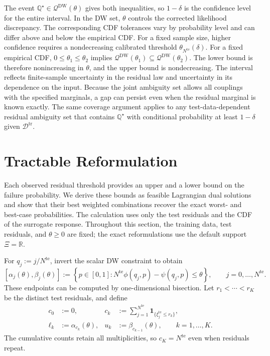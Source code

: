 \documentclass[review,11pt,3p,authoryear,nopreprintline]{elsarticle}
\begin{document}
The event $\mathbb Q^\star\in\mathscr Q^{\mathrm{DW}}(\theta)$ gives both inequalities, so $1-\delta$ is the confidence level for the entire interval. In the DW set, $\theta$ controls the corrected likelihood discrepancy. The corresponding CDF tolerances vary by probability level and can differ above and below the empirical CDF. For a fixed sample size, higher confidence requires a nondecreasing calibrated threshold $\theta_{N^{\mathrm{te}}}(\delta)$. For a fixed empirical CDF, $0\le\theta_1\le\theta_2$ implies $\mathscr Q^{\mathrm{DW}}(\theta_1)\subseteq\mathscr Q^{\mathrm{DW}}(\theta_2)$. The lower bound is therefore nonincreasing in $\theta$, and the upper bound is nondecreasing. The interval reflects finite-sample uncertainty in the residual law and uncertainty in its dependence on the input. Because the joint ambiguity set allows all couplings with the specified marginals, a gap can persist even when the residual marginal is known exactly. The same coverage argument applies to any test-data-dependent residual ambiguity set that contains $\mathbb Q^\star$ with conditional probability at least $1-\delta$ given $\mathcal D^{\mathrm{tr}}$.

\section{Tractable Reformulation}
\label{sec-reformulation}

Each observed residual threshold provides an upper and a lower bound on the failure probability. We derive these bounds as feasible Lagrangian dual solutions and show that their best weighted combinations recover the exact worst- and best-case probabilities. The calculation uses only the test residuals and the CDF of the surrogate response. Throughout this section, the training data, test residuals, and $\theta\ge0$ are fixed; the exact reformulations use the default support $\Xi=\mathbb R$.

For $q_j:=j/N^{\mathrm{te}}$, invert the scalar DW constraint to obtain
\begin{equation}
  \left[\alpha_j(\theta),\beta_j(\theta)\right]
  :=\left\{p\in[0,1]:
  N^{\mathrm{te}}\phi\left(q_j,p\right)-\psi\left(q_j,p\right)\le\theta\right\},
  \qquad j=0,\ldots,N^{\mathrm{te}}.
  \label{eq-dw-rank-acceptance}
\end{equation}
These endpoints can be computed by one-dimensional bisection. Let $r_1<\cdots<r_K$ be the distinct test residuals, and define
\begin{equation}
  \begin{aligned}
    c_0&:=0,&
    c_k&:=\sum_{j=1}^{N^{\mathrm{te}}}\mathbf1_{\{\xi_j^{\mathrm{te}}\le r_k\}},\\
    \ell_k&:=\alpha_{c_k}(\theta),&
    u_k&:=\beta_{c_{k-1}}(\theta),\qquad k=1,\ldots,K.
  \end{aligned}
  \label{eq-dw-counts-and-levels}
\end{equation}
The cumulative counts retain all multiplicities, so $c_K=N^{\mathrm{te}}$ even when residuals repeat.
\end{document}
